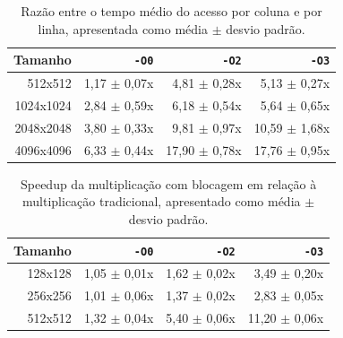 \begin{table}[ht]
\centering
\caption{Razão entre o tempo médio do acesso por coluna e por linha, apresentada como média $\pm$ desvio padrão.}
\label{tab:razao-coluna-linha}
\begin{tabular}{rrrr}
\toprule
Tamanho & \texttt{-O0} & \texttt{-O2} & \texttt{-O3} \\
\midrule
512x512 & 1,17 $\pm$ 0,07x & 4,81 $\pm$ 0,28x & 5,13 $\pm$ 0,27x \\
1024x1024 & 2,84 $\pm$ 0,59x & 6,18 $\pm$ 0,54x & 5,64 $\pm$ 0,65x \\
2048x2048 & 3,80 $\pm$ 0,33x & 9,81 $\pm$ 0,97x & 10,59 $\pm$ 1,68x \\
4096x4096 & 6,33 $\pm$ 0,44x & 17,90 $\pm$ 0,78x & 17,76 $\pm$ 0,95x \\
\bottomrule
\end{tabular}
\end{table}

\begin{table}[ht]
\centering
\caption{Speedup da multiplicação com blocagem em relação à multiplicação tradicional, apresentado como média $\pm$ desvio padrão.}
\label{tab:speedup-blocagem}
\begin{tabular}{rrrr}
\toprule
Tamanho & \texttt{-O0} & \texttt{-O2} & \texttt{-O3} \\
\midrule
128x128 & 1,05 $\pm$ 0,01x & 1,62 $\pm$ 0,02x & 3,49 $\pm$ 0,20x \\
256x256 & 1,01 $\pm$ 0,06x & 1,37 $\pm$ 0,02x & 2,83 $\pm$ 0,05x \\
512x512 & 1,32 $\pm$ 0,04x & 5,40 $\pm$ 0,06x & 11,20 $\pm$ 0,06x \\
\bottomrule
\end{tabular}
\end{table}